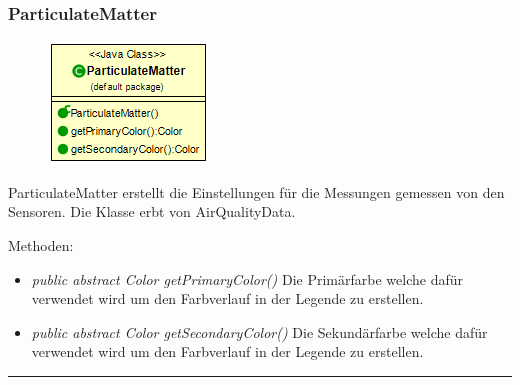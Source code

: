 \subsubsection{ParticulateMatter}
\begin{minipage}{0.3\textwidth}
    \begin{figure}[H]
        {\centering\includegraphics[scale = 0.6
        ]{media/view/airquality/ParticulateMatter_Class.png}}
    \end{figure}
    \end{minipage} \hfill
    \begin{minipage}{0.6\textwidth}
ParticulateMatter erstellt die Einstellungen für die Messungen gemessen von den Sensoren. Die Klasse erbt von AirQualityData.
\end{minipage}
\vspace{\baselineskip}
Methoden: \begin{itemize} [noitemsep]
	\item \emph{public abstract Color getPrimaryColor()} Die Primärfarbe welche dafür verwendet wird um den Farbverlauf in der Legende zu erstellen.
	\item \emph{public abstract Color getSecondaryColor()} Die Sekundärfarbe welche dafür verwendet wird um den Farbverlauf in der Legende zu erstellen.
\end{itemize}

\rule{\textwidth}{0.4pt}
